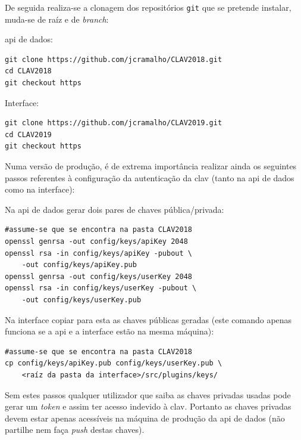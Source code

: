 De seguida realiza-se a clonagem dos repositórios \texttt{git} que se pretende instalar, muda-se de raíz e de \textit{branch}:

\footnotesize
\begin{center}
\begin{minipage}{0.49\textwidth}
\acrshort{api} de dados:
\begin{verbatim}
git clone https://github.com/jcramalho/CLAV2018.git
cd CLAV2018
git checkout https
\end{verbatim}
\end{minipage}%
\begin{minipage}{0.49\textwidth}
Interface:
\begin{verbatim}
git clone https://github.com/jcramalho/CLAV2019.git
cd CLAV2019
git checkout https
\end{verbatim}
\end{minipage}
\end{center}
\normalsize

Numa versão de produção, é de extrema importância realizar ainda os seguintes passos referentes à configuração da autenticação da \acrshort{clav} (tanto na \acrshort{api} de dados como na interface):

\footnotesize
\begin{center}
\begin{minipage}[t]{0.49\textwidth}
Na \acrshort{api} de dados gerar dois pares de chaves pública/privada:
\begin{verbatim}
#assume-se que se encontra na pasta CLAV2018 
openssl genrsa -out config/keys/apiKey 2048
openssl rsa -in config/keys/apiKey -pubout \
    -out config/keys/apiKey.pub
openssl genrsa -out config/keys/userKey 2048
openssl rsa -in config/keys/userKey -pubout \
    -out config/keys/userKey.pub
\end{verbatim}
\end{minipage}%
\begin{minipage}[t]{0.49\textwidth}
Na interface copiar para esta as chaves públicas geradas (este comando apenas funciona se a \acrshort{api} e a interface estão na mesma máquina):
\begin{verbatim}
#assume-se que se encontra na pasta CLAV2018 
cp config/keys/apiKey.pub config/keys/userKey.pub \
    <raíz da pasta da interface>/src/plugins/keys/
\end{verbatim}
\end{minipage}
\end{center}
\normalsize

Sem estes passos qualquer utilizador que saiba as chaves privadas usadas pode gerar um \textit{token} e assim ter acesso indevido à \acrshort{clav}. Portanto as chaves privadas devem estar apenas acessíveis na máquina de produção da \acrshort{api} de dados (não partilhe nem faça \textit{push} destas chaves).

